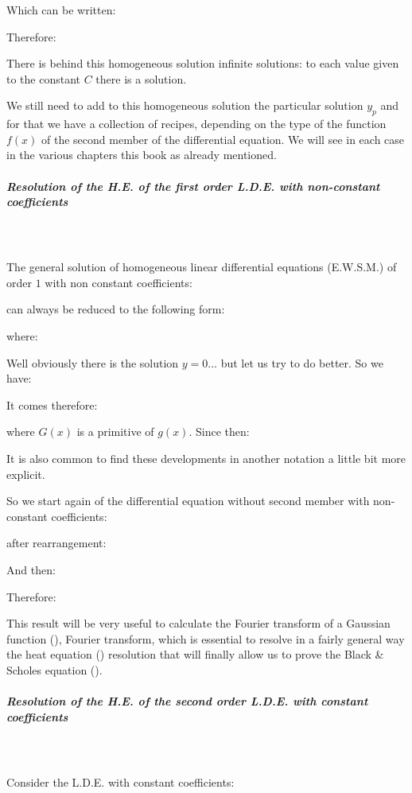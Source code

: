 	Which can be written:
	
	Therefore:
	
	There is behind this homogeneous solution infinite solutions: to each value given to the constant $C$ there is a solution.
	
	We still need to add to this homogeneous solution the particular solution $y_p$ and for that we have a collection of recipes, depending on the type of the function $f (x)$ of the second member of the differential equation. We will see in each case in the various chapters this book as already mentioned.
	
	\subparagraph{Resolution of the H.E. of the first order L.D.E. with non-constant coefficients}\mbox{}\\\\
	The general solution of homogeneous linear differential equations (E.W.S.M.) of order $1$ with non constant coefficients:
	
	can always be reduced to the following form:
	
	where:
	
	Well obviously there is the solution $y=0$... but let us try to do better. So we have:
	
	It comes therefore:
	
	where $G (x)$ is a primitive of $g (x)$. Since then:
	
	It is also common to find these developments in another notation a little bit more explicit.
	
	So we start again of the differential equation without second member with non-constant coefficients:
	
	after rearrangement:
	
	And then:
	
	Therefore:
	
	This result will be very useful to calculate the Fourier transform of a Gaussian function (), Fourier transform, which is essential to resolve in a fairly general way the heat equation () resolution that will finally allow us to prove the Black \& Scholes equation (). 
	
	\subparagraph{Resolution of the H.E. of the second order L.D.E. with constant coefficients}\label{second order differential equations}\mbox{}\\\\
	Consider the L.D.E. with constant coefficients:
	
